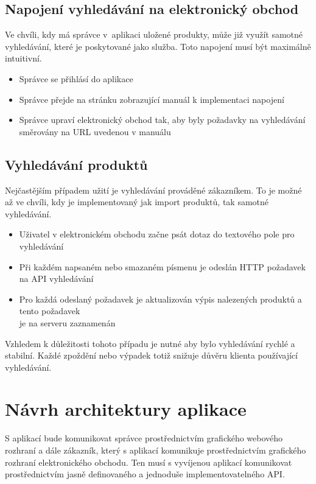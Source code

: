 \documentclass[FM,DP]{tulthesis}
\begin{document}
\subsection{Napojení vyhledávání na elektronický obchod}

Ve chvíli, kdy má správce v~aplikaci uložené produkty, může již využít samotné vyhledávání,
které je poskytované jako služba. Toto napojení musí být maximálně intuitivní.

\begin{itemize}
\item Správce se přihlásí do aplikace
\item Správce přejde na stránku zobrazující manuál k implementaci napojení
\item Správce upraví elektronický obchod tak, aby byly požadavky na vyhledávání \\
směrovány na URL uvedenou v manuálu
\end{itemize}

\subsection{Vyhledávání produktů}

Nejčastějším případem užití je vyhledávání prováděné zákazníkem. To je možné až ve chvíli, 
kdy je implementovaný jak import produktů, tak samotné vyhledávání. 

\begin{itemize}
\item Uživatel v elektronickém obchodu začne psát dotaz do textového pole pro vyhledávání
\item Při každém napsaném nebo smazaném písmenu je odeslán HTTP požadavek na API vyhledávání
\item Pro každá odeslaný požadavek je aktualizován výpis nalezených produktů a tento požadavek \\
je na serveru zaznamenán
\end{itemize}

Vzhledem k důležitosti tohoto případu je nutné aby bylo vyhledávání rychlé a stabilní.
Každé zpoždění nebo výpadek totiž snižuje důvěru klienta používající vyhledávání.

\section{Návrh architektury aplikace}

S aplikací bude komunikovat správce prostřednictvím grafického webového rozhraní a dále
zákazník, který s aplikací komunikuje prostřednictvím grafického rozhraní elektronického 
obchodu. Ten musí s vyvíjenou aplikací komunikovat prostřednictvím jasně definovaného
a jednoduše implementovatelného API.
\end{document}
